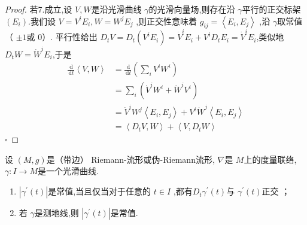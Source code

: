 \documentclass[../../几何与拓扑.tex]{subfiles}
\begin{document}
\begin{proof}
    若7.成立,设 \(  V,W  \)是沿光滑曲线 \(   \gamma   \)的光滑向量场,则存在沿 \(   \gamma   \)平行的正交标架 \(  \left( E_{i} \right)   \).我们设 \(  V= V^{i}E_{i},W =  W^{j}E_{j}  \)     ,则正交性意味着 \(  g_{ij} = \left<E_{i},E_{j} \right>  \) ,沿 \(   \gamma   \)取常值（ \(  \pm 1  \)或 \(  0  \)）.   平行性给出 \(   D_{t}V= D_{t}\left( V^{i}E_{i} \right)=  \dot{V}^{i}E_{i}+ V^{i}D_{t}E_{i}= \dot{V}^{i}E_{i}   \),类似地 \(  D_{t}W= \dot{W}^{i}E_{i}  \),于是 \[
    \begin{aligned}
        \frac{\,\mathrm{d}  }{\,\mathrm{d} t }\left<V,W \right>&=   \frac{\,\mathrm{d}  }{\,\mathrm{d} t }\left( \sum _{i}V^{i}W^{i} \right)\\ 
         &= \sum _{i}\left( \dot{V}^{i}W^{i}+  \dot{W}^{i}V^{i}  \right) \\ 
          & = \dot{V}^{i}W^{j}\left<E_{i},E_{j} \right> + V^{i}\dot{W}^{j}\left<E_{i},E_{j} \right> \\ 
           & = \left<D_{t}V,W \right>+ \left<V,D_{t}W \right>
    \end{aligned}
    \]  
    \hfill $\square$
\end{proof}

\begin{corollary}
    设 \(  \left( M,g \right)   \)是（带边） Riemann-流形或伪-Riemann流形,  \(   \nabla   \)是 \(  M  \)上的度量联络, \(   \gamma :I\to M  \)是一个光滑曲线.
    \begin{enumerate}
        \item  \(  \left|  \gamma ^{\prime} \left( t \right)  \right|  \)是常值,当且仅当对于任意的 \(  t \in I  \) ,都有\(  D_{t} \gamma ^{\prime} \left( t \right)   \)与 \(   \gamma ^{\prime} \left( t \right)   \)正交    ；
        \item 若 \(   \gamma   \)是测地线,则 \(  \left|  \gamma ^{\prime} \left( t \right)  \right|   \)是常值.  
    \end{enumerate}
       
\end{corollary}
\end{document}
